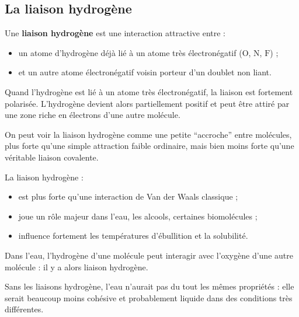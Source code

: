 \documentclass[11pt,a4paper]{article}
\begin{document}
\subsection{La liaison hydrogène}

\begin{definitionbox}
Une \textbf{liaison hydrogène} est une interaction attractive entre :
\begin{itemize}
    \item un atome d’hydrogène déjà lié à un atome très électronégatif (\(\mathrm{O}\), \(\mathrm{N}\), \(\mathrm{F}\)) ;
    \item et un autre atome électronégatif voisin porteur d’un doublet non liant.
\end{itemize}
\end{definitionbox}

\begin{ideebox}
Quand l’hydrogène est lié à un atome très électronégatif, la liaison est fortement polarisée.  
L’hydrogène devient alors partiellement positif et peut être attiré par une zone riche en électrons d’une autre molécule.
\end{ideebox}

\begin{analogebox}
On peut voir la liaison hydrogène comme une petite ``accroche'' entre molécules, plus forte qu’une simple attraction faible ordinaire, mais bien moins forte qu’une véritable liaison covalente.
\end{analogebox}

\begin{proprietebox}
La liaison hydrogène :
\begin{itemize}
    \item est plus forte qu’une interaction de Van der Waals classique ;
    \item joue un rôle majeur dans l’eau, les alcools, certaines biomolécules ;
    \item influence fortement les températures d’ébullition et la solubilité.
\end{itemize}
\end{proprietebox}

\begin{exemplebox}
Dans l’eau, l’hydrogène d’une molécule peut interagir avec l’oxygène d’une autre molécule : il y a alors liaison hydrogène.
\end{exemplebox}

\begin{comprendrebox}
Sans les liaisons hydrogène, l’eau n’aurait pas du tout les mêmes propriétés : elle serait beaucoup moins cohésive et probablement liquide dans des conditions très différentes.
\end{comprendrebox}
\end{document}
